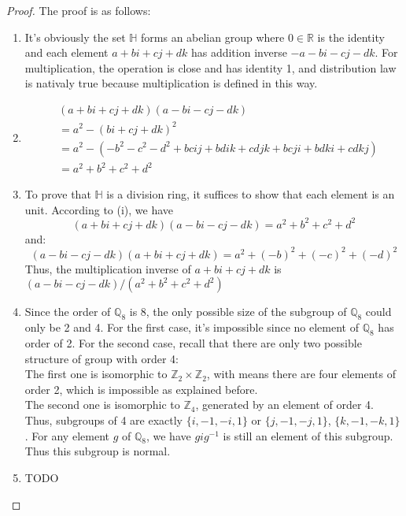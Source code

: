 \documentclass[a4paper, pdf, 12pt]{article}
\begin{document}
\begin{proof}
  The proof is as follows:
  \begin{enumerate} [leftmargin=0cm,itemindent=.2cm,labelwidth=\itemindent,labelsep=0.2cm,align=right,label=(\roman*)]
    \item It's obviously the set $\mathbb{H}$ forms an abelian group where $0\in \mathbb{R}$ is the identity and each element 
    $a+bi+cj+dk$ has addition inverse $-a-bi-cj-dk$. For multiplication, the operation is close and has identity 1, 
    and distribution law is nativaly true because multiplication is defined in this way.

    \item 
    $$
    \begin{aligned}
      &(a + bi + cj + dk)(a -bi-cj-dk) \\
      &= a^2 - (bi + cj + dk)^2 \\
      & = a^2 - (-b^2-c^2-d^2 + bcij + bdik 
       + cdjk + bcji + bdki + cdkj)\\
      & = a^2+b^2+c^2+d^2
    \end{aligned}
    $$

    \item 
    To prove that $\mathbb{H}$ is a division ring, it suffices to show that each 
    element is an unit.
    According to (i), we have 
    $$(a + bi + cj + dk)(a-bi-cj-dk) = a^2 + b^2+c^2+d^2$$
    and:
    $$(a - bi - cj -dk)(a+bi+cj+dk) = a^2 + (-b)^2 + (-c)^2 + (-d)^2$$
    Thus, the multiplication inverse of $a + bi+cj+dk$ is $(a-bi-cj-dk) / (a^2 + b^2+c^2+d^2)$

    \item 
    Since the order of $\mathbb{Q}_{8}$ is 8, the only possible size of the subgroup of 
    $\mathbb{Q}_{8}$ could only be 2 and 4. For the first case, it's impossible since no element 
    of $\mathbb{Q}_{8}$ has order of 2. For the second case, recall that there are only two possible 
    structure of group with order 4: \\
    The first one is isomorphic to $\mathbb{Z}_{2}\times \mathbb{Z}_{2}$, 
    with means there are four elements of order 2, which is impossible as explained before.\\
    The second one is isomorphic to $\mathbb{Z}_{4}$, generated by an element of order 4. Thus, subgroups 
    of 4 are exactly $\{i, -1, -i, 1\}$ or $\{j, -1, -j, 1\}$, $\{k, -1, -k, 1\}$. For any element $g$ of 
    $\mathbb{Q}_{8}$, we have $gig^{-1}$ is still an element of this subgroup. Thus this
    subgroup is normal.

    \item TODO
  \end{enumerate}
\end{proof}
\end{document}
